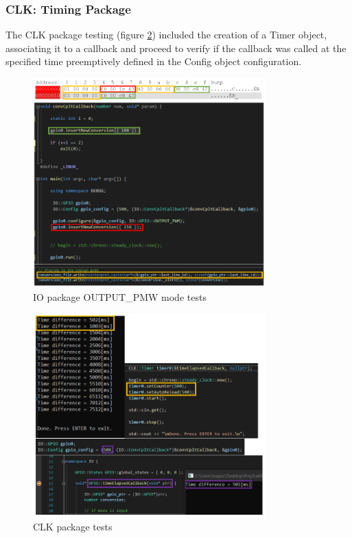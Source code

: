 \subsubsection{CLK: Timing Package}
%
The CLK package testing (figure \ref{fig:clk-test}) included the creation of a Timer object, associating it to a callback and proceed to verify if the callback was called at the specified time preemptively defined in the Config object configuration.
%
\begin{figure}[!ht]
\centering
\includegraphics[width=0.8\textwidth]{img/IO-test.png}
\caption{\label{fig:io-test}IO package OUTPUT\_PMW mode tests}
\end{figure}
%
%
\begin{figure}[!ht]
\centering
\includegraphics[width=0.8\textwidth]{img/CLK-test.png}
\caption{\label{fig:clk-test}CLK package tests}
\end{figure}
%